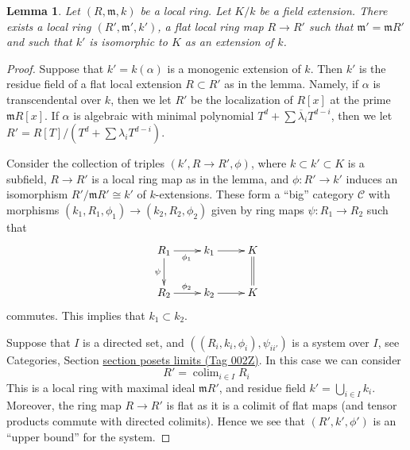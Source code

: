 \documentclass{amsart}
\theoremstyle{plain}
\newtheorem{lemma}[subsection]{Lemma}
\theoremstyle{definition}
\theoremstyle{remark}
\numberwithin{equation}{subsection}
\def\colim{\mathop{\mathrm{colim}}\nolimits}
\begin{document}
\begin{lemma}
\label{lemma-flat-local-given-residue-field}
Let $(R, \mathfrak m, k)$ be a local ring. Let $K/k$ be a field
extension. There exists a local ring $(R', \mathfrak m', k')$, a flat local
ring map $R \to R'$ such that $\mathfrak m' = \mathfrak mR'$ and such that
$k'$ is isomorphic to $K$ as an extension of $k$.
\end{lemma}

\begin{proof}
Suppose that $k' = k(\alpha)$ is a monogenic extension of $k$.
Then $k'$ is the residue field of a flat local extension $R \subset R'$
as in the lemma. Namely, if $\alpha$ is transcendental over $k$, then we let
$R'$ be the localization of $R[x]$ at the prime $\mathfrak mR[x]$.
If $\alpha$ is algebraic with minimal polynomial
$T^d + \sum \overline{\lambda}_iT^{d - i}$, then we let
$R' = R[T]/(T^d + \sum \lambda_i T^{d - i})$.

\medskip\noindent
Consider the collection of triples $(k', R \to R', \phi)$, where
$k \subset k' \subset K$ is a subfield,
$R \to R'$ is a local ring map as in the lemma, and
$\phi : R' \to k'$ induces an isomorphism $R'/\mathfrak mR' \cong k'$
of $k$-extensions. These form a ``big'' category $\mathcal{C}$ with morphisms
$(k_1, R_1, \phi_1) \to (k_2, R_2, \phi_2)$
given by ring maps $\psi : R_1 \to R_2$ such that
$$
\xymatrix{
R_1 \ar[d]_\psi \ar[r]_{\phi_1} & k_1 \ar[r] & K \ar@{=}[d] \\
R_2 \ar[r]^{\phi_2} & k_2 \ar[r] & K
}
$$
commutes. This implies that $k_1 \subset k_2$.

\medskip\noindent
Suppose that $I$ is a directed set, and
$((R_i, k_i, \phi_i), \psi_{ii'})$ is a system over $I$, see
Categories, Section \href{https://stacks.math.columbia.edu/tag/002Z}{section posets limits (Tag 002Z)}.
In this case we can consider
$$
R' = \colim_{i \in I} R_i
$$
This is a local ring with maximal ideal $\mathfrak mR'$, and
residue field $k' = \bigcup_{i \in I} k_i$. Moreover, the ring
map $R \to R'$ is flat as it is a colimit of flat maps (and tensor
products commute with directed colimits).
Hence we see that $(R', k', \phi')$ is an ``upper bound'' for the system.


\end{proof}
\end{document}
